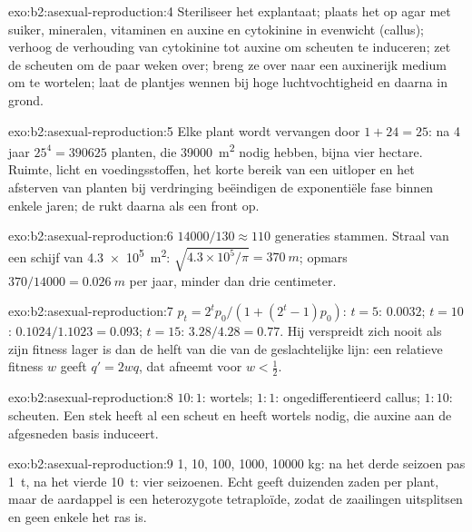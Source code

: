 \begin{solution}{exo:b2:asexual-reproduction:4}
Steriliseer het explantaat; plaats het op agar met suiker, mineralen,
vitaminen en auxine en cytokinine in evenwicht (callus); verhoog de
verhouding van cytokinine tot auxine om scheuten te induceren; zet de
scheuten om de paar weken over; breng ze over naar een auxinerijk medium
om te wortelen; laat de plantjes wennen bij hoge luchtvochtigheid en
daarna in grond.
\end{solution}

\begin{solution}{exo:b2:asexual-reproduction:5}
Elke plant wordt vervangen door $1 + 24 = 25$: na 4 jaar $25^{4} =
\num{390625}$ planten, die \qty{39000}{m^2} nodig hebben, bijna vier
hectare. Ruimte, licht en voedingsstoffen, het korte bereik van een
uitloper en het afsterven van planten bij verdringing beëindigen de
exponentiële fase binnen enkele jaren; de  rukt daarna als een front
op.
\end{solution}

\begin{solution}{exo:b2:asexual-reproduction:6}
$\num{14000}/130 \approx 110$ generaties stammen. Straal van een schijf
van \qty{4.3e5}{m^2}: $\sqrt{4.3\times 10^{5}/\pi} = \qty{370}{m}$;
opmars $370/\num{14000} = \qty{0.026}{m}$ per jaar, minder dan drie
centimeter.
\end{solution}

\begin{solution}{exo:b2:asexual-reproduction:7}
$p_t = 2^{t}p_0/(1 + (2^{t} - 1)p_0)$: $t = 5$: $0.0032$; $t = 10$:
$0.1024/1.1023 = 0.093$; $t = 15$: $3.28/4.28 = 0.77$. Hij verspreidt
zich nooit als zijn fitness lager is dan de helft van die van de
geslachtelijke lijn: een relatieve fitness $w$ geeft $q' = 2wq$, dat
afneemt voor $w <
\tfrac12$.
\end{solution}

\begin{solution}{exo:b2:asexual-reproduction:8}
$10 : 1$: wortels; $1 : 1$: ongedifferentieerd callus; $1 : 10$: scheuten.
Een stek heeft al een scheut en heeft wortels nodig, die auxine aan de
afgesneden basis induceert.
\end{solution}

\begin{solution}{exo:b2:asexual-reproduction:9}
1, 10, 100, \num{1000}, \num{10000} kg: na het derde seizoen pas
\qty{1}{t}, na het vierde \qty{10}{t}: vier seizoenen. Echt  geeft
duizenden zaden per plant, maar de aardappel is een heterozygote
tetraploïde, zodat de zaailingen uitsplitsen en geen enkele het ras is.
\end{solution}

